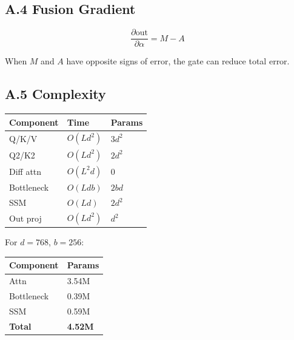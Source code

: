 \subsection{A.4 Fusion Gradient}

\[
\frac{\partial \text{out}}{\partial \alpha} = M - A
\tag{A.7}
\]

When $M$ and $A$ have opposite signs of error, the gate can reduce total 
error.

\subsection{A.5 Complexity}

\begin{table}[H]
\centering
\small
\begin{tabular}{lll}
\toprule
\textbf{Component} & \textbf{Time} & \textbf{Params} \\
\midrule
Q/K/V & $O(L d^2)$ & $3 d^2$ \\
Q2/K2 & $O(L d^2)$ & $2 d^2$ \\
Diff attn & $O(L^2 d)$ & 0 \\
Bottleneck & $O(L d b)$ & $2 b d$ \\
SSM & $O(L d)$ & $2 d^2$ \\
Out proj & $O(L d^2)$ & $d^2$ \\
\bottomrule
\end{tabular}
\end{table}

For $d = 768$, $b = 256$:

\begin{table}[H]
\centering
\small
\begin{tabular}{ll}
\toprule
\textbf{Component} & \textbf{Params} \\
\midrule
Attn & 3.54M \\
Bottleneck & 0.39M \\
SSM & 0.59M \\
\textbf{Total} & \textbf{4.52M} \\
\bottomrule
\end{tabular}
\end{table}

